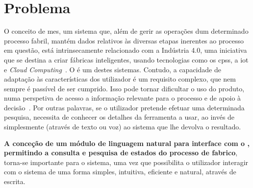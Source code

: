 \section{Problema}
\label{sec:chap01_problem}
O conceito de \gls{mes}, um sistema que, além de gerir as operações dum determinado processo fabril, mantém dados relativos às diversas etapas inerentes ao processo em questão, está intrinsecamente relacionado com a Indústria 4.0, uma iniciativa que se destina a criar fábricas inteligentes, usando tecnologias como os \glspl{cps}, a \gls{iot} e \textit{Cloud Computing}~\parencite{intelligent_manufacturing_context_industry40_review}. O {\productname} é um destes sistemas. Contudo, a capacidade de adaptação às características dos utilizador é um requisito complexo, que nem sempre é passível de ser cumprido. Isso pode tornar dificultar o uso do produto, numa perspetiva de acesso a informação relevante para o processo e de apoio à decisão~\parencite{intelligent_manufacturing_context_industry40_review}. Por outras palavras, se o utilizador pretende efetuar uma determinada pesquisa, necessita de conhecer os detalhes da ferramenta a usar, ao invés de simplesmente  (através de texto ou voz) ao sistema que lhe devolva o resultado.

\textbf{A conceção de um módulo de linguagem natural para interface com o {\productname}, permitindo a consulta e pesquisa de estados do processo de fabrico}, torna-se importante para o sistema, uma vez que possibilita o utilizador interagir com o sistema de uma forma simples, intuitiva, eficiente e natural, através de escrita.